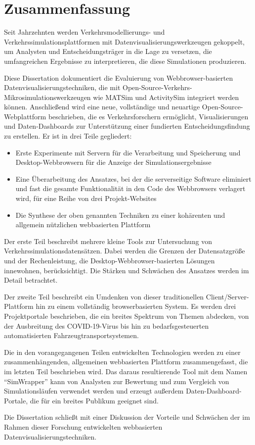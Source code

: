 \chapter*{Zusammenfassung}

Seit Jahrzehnten werden Verkehrsmodellierungs- und Verkehrssimulationsplattformen mit Datenvisualisierungswerkzeugen gekoppelt, um Analysten und Entscheidungsträger in die Lage zu versetzen, die umfangreichen Ergebnisse zu interpretieren, die diese Simulationen produzieren.

Diese Dissertation dokumentiert die Evaluierung von Webbrowser-basierten Datenvisualisierungstechniken, die mit Open-Source-Verkehrs-Mikrosimulationswerkzeugen wie MATSim und ActivitySim integriert werden können. Anschließend wird eine neue, vollständige und neuartige Open-Source-Webplattform beschrieben, die es Verkehrsforschern ermöglicht, Visualisierungen und Daten-Dashboards zur Unterstützung einer fundierten Entscheidungsfindung zu erstellen. Er ist in drei Teile gegliedert:

\begin{itemize}
  \item Erste Experimente mit Servern für die Verarbeitung und Speicherung und Desktop-Webbrowsern für die Anzeige der Simulationsergebnisse
  \item Eine Überarbeitung des Ansatzes, bei der die serverseitige Software eliminiert und fast die gesamte Funktionalität in den Code des Webbrowsers verlagert wird, für eine Reihe von drei Projekt-Websites
  \item Die Synthese der oben genannten Techniken zu einer kohärenten und allgemein nützlichen webbasierten Plattform
\end{itemize}

Der erste Teil beschreibt mehrere kleine Tools zur Untersuchung von Verkehrssimulationsdatensätzen. Dabei werden die Grenzen der Datensatzgröße und der Rechenleistung, die Desktop-Webbrowser-basierten Lösungen innewohnen, berücksichtigt. Die Stärken und Schwächen des Ansatzes werden im Detail betrachtet.

Der zweite Teil beschreibt ein Umdenken von dieser traditionellen Client/Server-Plattform hin zu einem vollständig browserbasierten System. Es werden drei Projektportale beschrieben, die ein breites Spektrum von Themen abdecken, von der Ausbreitung des COVID-19-Virus bis hin zu bedarfsgesteuerten automatisierten Fahrzeugtransportsystemen.

Die in den vorangegangenen Teilen entwickelten Technologien werden zu einer zusammenhängenden, allgemeinen webbasierten Plattform zusammengefasst, die im letzten Teil beschrieben wird. Das daraus resultierende Tool mit dem Namen ``SimWrapper'' kann von Analysten zur Bewertung und zum Vergleich von Simulationsläufen verwendet werden und erzeugt außerdem Daten-Dashboard-Portale, die für ein breites Publikum geeignet sind.

Die Dissertation schließt mit einer Diskussion der Vorteile und Schwächen der im Rahmen dieser Forschung entwickelten webbasierten Datenvisualisierungstechniken.
